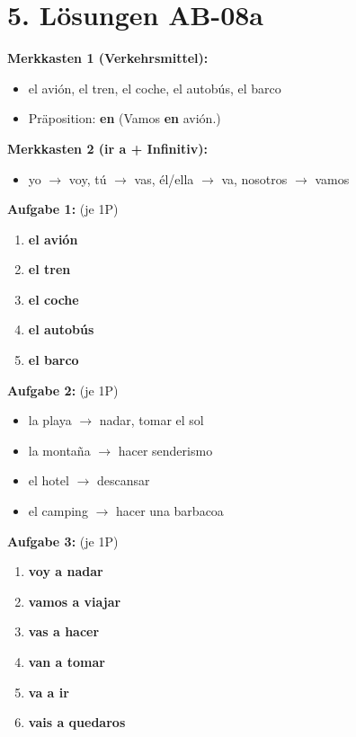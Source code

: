 \documentclass[11pt, a4paper]{article}
\newcommand{\loesung}[1]{\textcolor{loesung}{\textbf{#1}}}
\begin{document}

\section*{5. Lösungen AB-08a}

\textbf{Merkkasten 1 (Verkehrsmittel):}
\begin{itemize}
    \item el avión, el tren, el coche, el autobús, el barco
    \item Präposition: \textbf{en} (Vamos \textbf{en} avión.)
\end{itemize}

\textbf{Merkkasten 2 (ir a + Infinitiv):}
\begin{itemize}
    \item yo $\rightarrow$ voy, tú $\rightarrow$ vas, él/ella $\rightarrow$ va, nosotros $\rightarrow$ vamos
\end{itemize}

\vspace{0.5em}

\textbf{Aufgabe 1:} (je 1P)
\begin{enumerate}[label=\alph*)]
    \item \loesung{el avión}
    \item \loesung{el tren}
    \item \loesung{el coche}
    \item \loesung{el autobús}
    \item \loesung{el barco}
\end{enumerate}

\textbf{Aufgabe 2:} (je 1P)
\begin{itemize}
    \item la playa $\rightarrow$ nadar, tomar el sol
    \item la montaña $\rightarrow$ hacer senderismo
    \item el hotel $\rightarrow$ descansar
    \item el camping $\rightarrow$ hacer una barbacoa
\end{itemize}

\textbf{Aufgabe 3:} (je 1P)
\begin{enumerate}[label=\alph*)]
    \item \loesung{voy a nadar}
    \item \loesung{vamos a viajar}
    \item \loesung{vas a hacer}
    \item \loesung{van a tomar}
    \item \loesung{va a ir}
    \item \loesung{vais a quedaros}
\end{enumerate}
\end{document}
